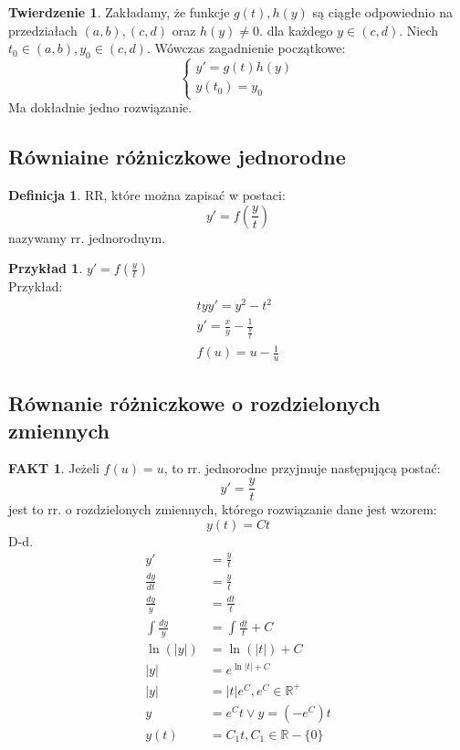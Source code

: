 \documentclass{article}
\theoremstyle{definition}
\newtheorem{de}{Definicja}[subsection]
\theoremstyle{definition}
\newtheorem{tw}{Twierdzenie}[subsection]
\theoremstyle{definition}
\newtheorem{pk}{Przykład}[subsection]
\theoremstyle{definition}
\newtheorem*{fakt}{FAKT}
\begin{document}
\begin{tw}
    Zakładamy, że funkcje $g(t), h(y)$ są ciągłe odpowiednio na przedziałach $(a,b), (c,d)$ oraz $h(y)\neq 0$.
    dla każdego $y\in(c,d)$. Niech $t_0\in(a,b), y_0\in(c,d)$. Wówczas zagadnienie początkowe:
    $$
    \begin{cases}
        y' = g(t)h(y)\\
        y(t_0) = y_0
    \end{cases}
    $$
    Ma dokładnie jedno rozwiązanie.
\end{tw}

\subsection{Równiaine różniczkowe jednorodne}

\begin{de}
    RR, które można zapisać w postaci:
    \[y' = f\left(\frac{y}{t}\right)\]
    nazywamy rr. jednorodnym.
\end{de}

\begin{pk}
    $y'=f\left(\frac{y}{t}\right)$\\
    Przykład:\\
    \begin{align}
        ty y' = y^2 - t^2\\
        y' = \frac{x}{y} - \frac{1}{\frac{y}{t}}\\
        f(u)=u-\frac{1}{u}
    \end{align}
\end{pk}

\subsection{Równanie różniczkowe o rozdzielonych zmiennych}

\begin{fakt}
    Jeżeli $f(u)=u$, to rr. jednorodne przyjmuje następującą postać:
    \[y' = \frac{y}{t}\]
    jest to rr. o rozdzielonych zmiennych, którego rozwiązanie dane jest wzorem:
    \[y(t)=Ct\]
    D-d.\\
    \begin{align}
        y' &= \frac{y}{t}\\
        \frac{dy}{dt} &= \frac{y}{t}\\
        \frac{dy}{y} &= \frac{dt}{t}\\
        \int \frac{dy}{y} &= \int \frac{dt}{t} + C\\
        \ln(|y|) &= \ln(|t|) + C\\
        |y| &= e^{\ln|t| + C}\\
        |y| &= |t|e^{C}, e^{C} \in \mathbb{R^{+}}\\
        y &= e^{C}t \lor y=(-e^{C}) t\\
        y(t) &= C_1 t, C_1 \in \mathbb{R}-\{0\}
    \end{align}
\end{fakt}
\end{document}

